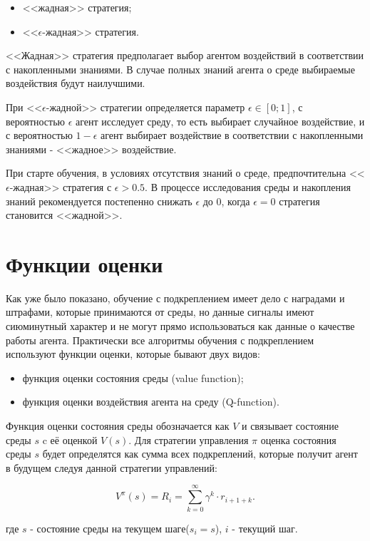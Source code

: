 \begin{itemize}
	\item <<жадная>> стратегия;
	\item <<$ \epsilon $-жадная>> стратегия.
\end{itemize}

<<Жадная>> стратегия предполагает выбор агентом воздействий в соответствии с накопленными знаниями. В случае полных знаний агента о среде выбираемые воздействия будут наилучшими. 

При <<$ \epsilon $-жадной>> стратегии определяется параметр $ \epsilon \in [0; 1] $, с вероятностью $ \epsilon $ агент исследует среду, то есть выбирает случайное воздействие, и с вероятностью $ 1-\epsilon $ агент выбирает воздействие в соответствии с накопленными знаниями - <<жадное>> воздействие.

При старте обучения, в условиях отсутствия знаний о среде, предпочтительна <<$ \epsilon $-жадная>> стратегия с $ \epsilon > 0.5$. В процессе исследования среды и накопления знаний рекомендуется постепенно снижать $ \epsilon $ до 0, когда $ \epsilon = 0 $ стратегия становится <<жадной>>.

\section{Функции оценки} \label{sect1_3}
Как уже было показано, обучение с подкреплением имеет дело с наградами и штрафами, которые принимаются от среды, но данные сигналы имеют сиюминутный характер и не могут прямо использоваться как данные о качестве работы агента. Практически все алгоритмы обучения с подкреплением используют функции оценки, которые бывают двух видов:
\begin{itemize}
	\item функция оценки состояния среды (value function);
	\item функция оценки воздействия агента на среду (Q-function).
\end{itemize}

Функция оценки состояния среды обозначается как $ V $ и связывает состояние среды $ s $ c её оценкой $ V(s) $. Для стратегии управления $ \pi $ оценка состояния среды $ s $ будет определятся как сумма всех подкреплений, которые получит агент в будущем следуя данной стратегии управлений:
 
$$ V^\pi(s)=R_i=\sum \limits_{k=0}^{\infty}\gamma^k \cdot r_{i+1+k}. $$

\noindent где $ s $ - состояние среды на текущем шаге($ s_i=s $), $ i $ - текущий шаг. 


